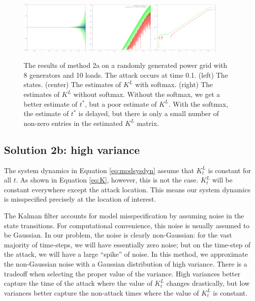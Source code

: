 \documentclass{article}
\begin{document}
\begin{figure}
\includegraphics[width=0.3\textwidth]{method2a/random-8x10x25-states}
\includegraphics[width=0.3\textwidth]{method2a/random-8x10x25-K_L}
\includegraphics[width=0.3\textwidth]{method2a/random-8x10x25-K_L-raw}
\caption{
    The results of method 2a on a randomly generated power grid with 8 generators and 10 loads.
    The attack occurs at time 0.1.
    (left) The states.
    (center) The estimates of $K^L$ with softmax.
    (right) The estimates of $K^L$ without softmax.
    Without the softmax, we get a better estimate of $t^*$, but a poor estimate of $K^L$.
    With the softmax, the estimate of $t^*$ is delayed, but there is only a small number of non-zero entries in the estimated $K^L$ matrix.
}
\end{figure}

\subsection*{Solution 2b: high variance}
The system dynamics in Equation \ref{eq:modsysdyn} assume that $K_t^L$ is constant for all $t$.
As shown in Equation \ref{eq:K}, however, this is not the case.
$K_t^L$ will be constant everywhere except the attack location.
This means our system dynamics is misspecified precisely at the location of interest.

The Kalman filter accounts for model misspecification by assuming noise in the state transitions.
For computational convenience, this noise is usually assumed to be Gaussian.
In our problem, the noise is clearly non-Gaussian:
for the vast majority of time-steps, we will have essentially zero noise;
but on the time-step of the attack, we will have a large ``spike'' of noise.
In this method, we approximate the non-Gaussian noise with a Gaussian distribution of high variance.
There is a tradeoff when selecting the proper value of the variance.
High variances better capture the time of the attack where the value of $K_t^L$ changes drastically,
but low variances better capture the non-attack times where the value of $K_t^L$ is constant.
\end{document}
